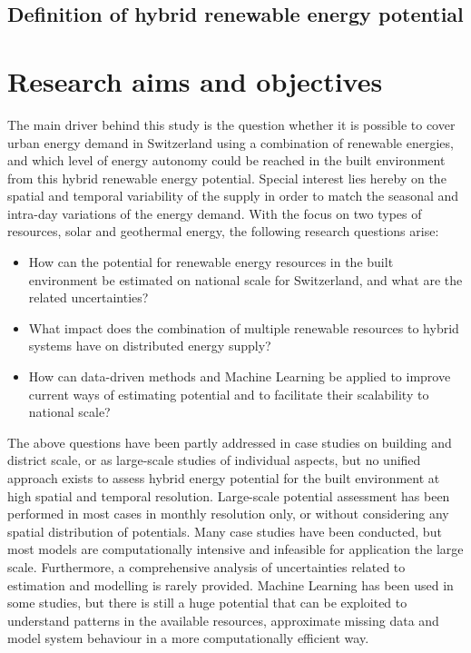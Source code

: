 
\subsection{Definition of hybrid renewable energy potential}

\section{Research aims and objectives}
\label{intro_goals}
The main driver behind this study is the question whether it is possible to cover urban energy demand in Switzerland using a combination of renewable energies, and which level of energy autonomy could be reached in the built environment from this hybrid renewable energy potential. Special interest lies hereby on the spatial and temporal variability of the supply in order to match the seasonal and intra-day variations of the energy demand. With the focus on two types of resources, solar and geothermal energy, the following research questions arise:

\begin{itemize}
\item How can the potential for renewable energy resources in the built environment be estimated on national scale for Switzerland, and what are the related uncertainties?
\item What impact does the combination of multiple renewable resources to hybrid systems have on distributed energy supply?
\item How can data-driven methods and Machine Learning be applied to improve current ways of estimating potential and to facilitate their scalability to national scale?
\end{itemize}

The above questions have been partly addressed in case studies on building and district scale, or as large-scale studies of individual aspects, but no unified approach exists to assess hybrid energy potential for the built environment at high spatial and temporal resolution. Large-scale potential assessment has been performed in most cases in monthly resolution only, or without considering any spatial distribution of potentials. Many case studies have been conducted, but most models are computationally intensive and infeasible for application the large scale. Furthermore, a comprehensive analysis of uncertainties related to estimation and modelling is rarely provided. Machine Learning has been used in some studies, but there is still a huge potential that can be exploited to understand patterns in the available resources, approximate missing data and model system behaviour in a more computationally efficient way.

